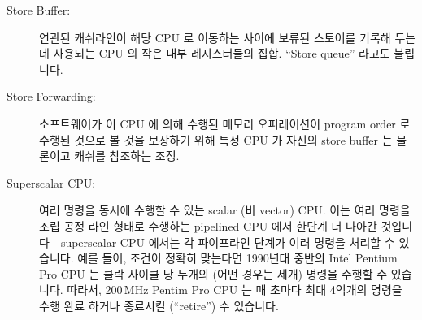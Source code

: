 \begin{description}
\item[Store Buffer:]
	연관된 캐쉬라인이 해당 CPU 로 이동하는 사이에 보류된 스토어를 기록해
	두는데 사용되는 CPU 의 작은 내부 레지스터들의 집합.
	``Store queue'' 라고도 불립니다.
\item[Store Forwarding:]
	소프트웨어가 이 CPU 에 의해 수행된 메모리 오퍼레이션이 program order 로
	수행된 것으로 볼 것을 보장하기 위해 특정 CPU 가 자신의 store buffer 는
	물론이고 캐쉬를 참조하는 조정.
\item[Superscalar CPU:]
	여러 명령을 동시에 수행할 수 있는 scalar (비 vector) CPU.
	이는 여러 명령을 조립 공정 라인 형태로 수행하는 pipelined CPU 에서
	한단계 더 나아간 것입니다---superscalar CPU 에서는 각 파이프라인 단계가
	여러 명령을 처리할 수 있습니다.
	예를 들어, 조건이 정확히 맞는다면 1990년대 중반의 Intel Pentium Pro CPU
	는 클락 사이클 당 두개의 (어떤 경우는 세개) 명령을 수행할 수 있습니다.
	따라서, 200\,MHz Pentim Pro CPU 는 매 초마다 최대 4억개의 명령을 수행
	완료 하거나 종료시킬 (``retire'') 수 있습니다.

\iffalse

\item[Store Buffer:]\index{Store buffer}
	A small set of internal registers used by a given CPU
	to record pending stores
	while the corresponding cache lines are making their
	way to that CPU\@.
	Also called ``store queue''.
\item[Store Forwarding:]\index{Store forwarding}
	An arrangement where a given CPU refers to its store buffer
	as well as its cache so as to ensure that the software sees
	the memory operations performed by this CPU as if they
	were carried out in program order.
\item[Superscalar CPU:]\index{Superscalar CPU}
	A scalar (non-vector) CPU capable of executing multiple instructions
	concurrently.
	This is a step up from a pipelined CPU that executes multiple
	instructions in an assembly-line fashion---in a superscalar
	CPU, each stage of the pipeline would be capable of handling
	more than one instruction.
	For example, if the conditions were exactly right,
	the Intel Pentium Pro CPU from the mid-1990s could
	execute two (and sometimes three) instructions per clock cycle.
	Thus, a 200\,MHz Pentium Pro CPU could ``retire'', or complete the
	execution of, up to 400 million instructions per second.

\fi


\end{description}
